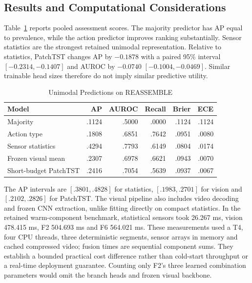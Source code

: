 \subsection{Results and Computational Considerations}
Table~\ref{tab:reassemble-unimodal} reports pooled assessment scores. The majority
predictor has AP equal to prevalence, while the action predictor improves ranking
substantially. Sensor statistics are the strongest retained unimodal representation.
Relative to statistics, PatchTST changes AP by $-0.1878$ with a paired 95\% interval
$[-0.2314,-0.1407]$ and AUROC by $-0.0740$ $[-0.1004,-0.0469]$. Similar trainable head
sizes therefore do not imply similar predictive utility.

\begin{table}[htbp]
\caption{Unimodal Predictions on REASSEMBLE}\label{tab:reassemble-unimodal}
\centering\small

\begin{tabular*}{\linewidth}{@{\extracolsep{\fill}}lrrrrr@{}}\toprule
Model & AP & AUROC & Recall & Brier & ECE\\\midrule
Majority & .1124 & .5000 & .0000 & .1124 & .1124\\
Action type & .1808 & .6851 & .7642 & .0951 & .0080\\
Sensor statistics & .4294 & .7793 & .6149 & .0804 & .0174\\
Frozen visual mean & .2307 & .6978 & .6621 & .0943 & .0070\\
Short-budget PatchTST & .2416 & .7054 & .5639 & .0937 & .0067\\\bottomrule
\end{tabular*}
\end{table}

The AP intervals are $[.3801,.4828]$ for statistics, $[.1983,.2701]$ for vision and
$[.2102,.2826]$ for PatchTST. The visual pipeline also includes video decoding and
frozen CNN extraction, unlike fitting directly on compact statistics. In the retained
warm-component benchmark, statistical sensors took 26.267 ms, vision 478.415 ms, F2
504.693 ms and F6 564.021 ms. These measurements used a T4, four CPU threads, three
deterministic segments, sensor arrays in memory and cached compressed video; fusion
times are sequential component sums. They establish a bounded practical cost difference
rather than cold-start throughput or a real-time deployment guarantee. Counting only
F2's three learned combination parameters would omit the branch heads and frozen visual
backbone.

